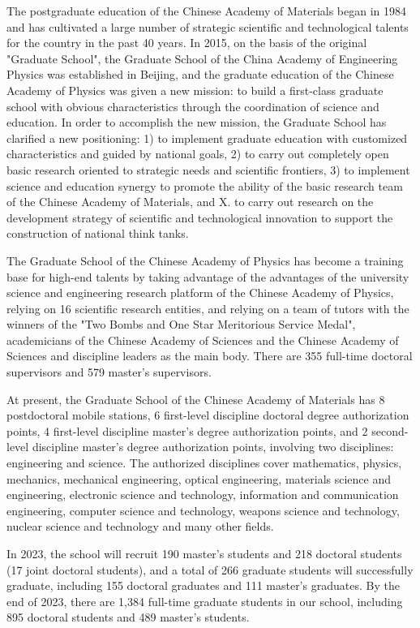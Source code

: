 The postgraduate education of the Chinese Academy of Materials began in 1984 and has cultivated a large number of strategic scientific and technological talents for the country in the past 40 years. In 2015, on the basis of the original "Graduate School", the Graduate School of the China Academy of Engineering Physics was established in Beijing, and the graduate education of the Chinese Academy of Physics was given a new mission: to build a first-class graduate school with obvious characteristics through the coordination of science and education. In order to accomplish the new mission, the Graduate School has clarified a new positioning: 1) to implement graduate education with customized characteristics and guided by national goals, 2) to carry out completely open basic research oriented to strategic needs and scientific frontiers, 3) to implement science and education synergy to promote the ability of the basic research team of the Chinese Academy of Materials, and X. to carry out research on the development strategy of scientific and technological innovation to support the construction of national think tanks.

The Graduate School of the Chinese Academy of Physics has become a training base for high-end talents by taking advantage of the advantages of the university science and engineering research platform of the Chinese Academy of Physics, relying on 16 scientific research entities, and relying on a team of tutors with the winners of the "Two Bombs and One Star Meritorious Service Medal", academicians of the Chinese Academy of Sciences and the Chinese Academy of Sciences and discipline leaders as the main body. There are 355 full-time doctoral supervisors and 579 master's supervisors.

At present, the Graduate School of the Chinese Academy of Materials has 8 postdoctoral mobile stations, 6 first-level discipline doctoral degree authorization points, 4 first-level discipline master's degree authorization points, and 2 second-level discipline master's degree authorization points, involving two disciplines: engineering and science. The authorized disciplines cover mathematics, physics, mechanics, mechanical engineering, optical engineering, materials science and engineering, electronic science and technology, information and communication engineering, computer science and technology, weapons science and technology, nuclear science and technology and many other fields.

In 2023, the school will recruit 190 master's students and 218 doctoral students (17 joint doctoral students), and a total of 266 graduate students will successfully graduate, including 155 doctoral graduates and 111 master's graduates. By the end of 2023, there are 1,384 full-time graduate students in our school, including 895 doctoral students and 489 master's students.

